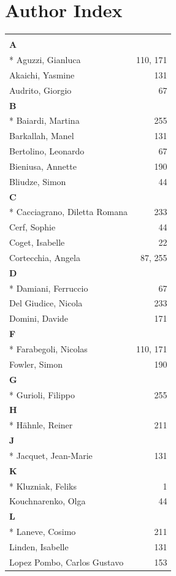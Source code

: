 \documentclass[]{llncs}
\begin{document}
\section*{Author Index}
\begin{longtable}{l@{~~~~~}r}
\multicolumn{2}{c}{\hspace*{400pt}} \kill
\\
\textbf{A} \\*
Aguzzi, Gianluca & 110, 171
\\
Akaichi, Yasmine & 131
\\
Audrito, Giorgio & 67
\\
\textbf{B} \\*
Baiardi, Martina & 255
\\
Barkallah, Manel & 131
\\
Bertolino, Leonardo & 67
\\
Bieniusa, Annette & 190
\\
Bliudze, Simon & 44
\\
\textbf{C} \\*
Cacciagrano, Diletta Romana & 233
\\
Cerf, Sophie & 44
\\
Coget, Isabelle & 22
\\
Cortecchia, Angela & 87, 255
\\
\textbf{D} \\*
Damiani, Ferruccio & 67
\\
Del Giudice, Nicola & 233
\\
Domini, Davide & 171
\\
\textbf{F} \\*
Farabegoli, Nicolas & 110, 171
\\
Fowler, Simon & 190
\\
\textbf{G} \\*
Gurioli, Filippo & 255
\\
\textbf{H} \\*
H\"ahnle, Reiner & 211
\\
\textbf{J} \\*
Jacquet, Jean-Marie & 131
\\
\textbf{K} \\*
Kluzniak, Feliks & 1
\\
Kouchnarenko, Olga & 44
\\
\textbf{L} \\*
Laneve, Cosimo & 211
\\
Linden, Isabelle & 131
\\
Lopez Pombo, Carlos Gustavo & 153
\\

\end{longtable}
\end{document}
